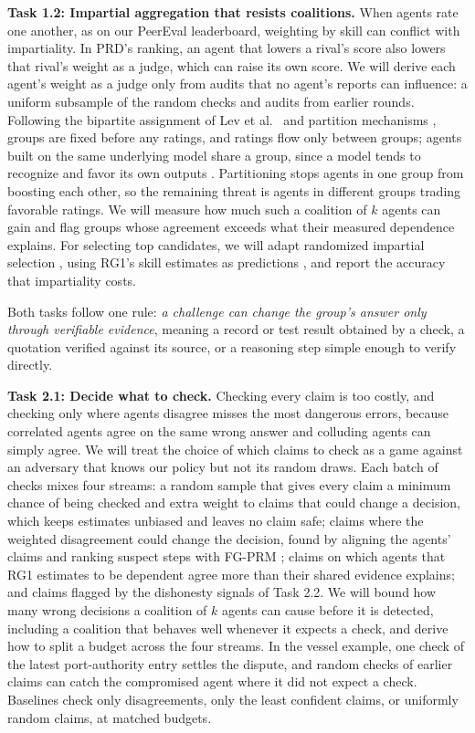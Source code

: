 \documentclass[11pt,letterpaper]{article}
\newcommand{\rg}[1]{\par\vspace{1pt}{\normalfont\bfseries\itshape #1}\par}
\newcommand{\task}[1]{\textbf{#1}\hspace{0.4em}}
\begin{document}
\task{Task 1.2: Impartial aggregation that resists coalitions.} When agents rate one another, as on our PeerEval leaderboard, weighting by skill can conflict with impartiality. In PRD's ranking, an agent that lowers a rival's score also lowers that rival's weight as a judge, which can raise its own score. We will derive each agent's weight as a judge only from audits that no agent's reports can influence: a uniform subsample of the random checks and audits from earlier rounds. Following the bipartite assignment of Lev et al.\ \cite{lev2023peernomination} and partition mechanisms \cite{alon2011sum}, groups are fixed before any ratings, and ratings flow only between groups; agents built on the same underlying model share a group, since a model tends to recognize and favor its own outputs \cite{panickssery2024recognize}. Partitioning stops agents in one group from boosting each other, so the remaining threat is agents in different groups trading favorable ratings. We will measure how much such a coalition of $k$ agents can gain and flag groups whose agreement exceeds what their measured dependence explains. For selecting top candidates, we will adapt randomized impartial selection \cite{kurokawa2015impartial}, using RG1's skill estimates as predictions \cite{cembrano2025predictions}, and report the accuracy that impartiality costs.

\rg{RG2. Decide what to check, and settle disputes with evidence}
Both tasks follow one rule: \emph{a challenge can change the group's answer only through verifiable evidence}, meaning a record or test result obtained by a check, a quotation verified against its source, or a reasoning step simple enough to verify directly.

\task{Task 2.1: Decide what to check.} Checking every claim is too costly, and checking only where agents disagree misses the most dangerous errors, because correlated agents agree on the same wrong answer and colluding agents can simply agree. We will treat the choice of which claims to check as a game against an adversary that knows our policy but not its random draws. Each batch of checks mixes four streams: a random sample that gives every claim a minimum chance of being checked and extra weight to claims that could change a decision, which keeps estimates unbiased and leaves no claim safe; claims where the weighted disagreement could change the decision, found by aligning the agents' claims and ranking suspect steps with FG-PRM \cite{li2025fgprm}; claims on which agents that RG1 estimates to be dependent agree more than their shared evidence explains; and claims flagged by the dishonesty signals of Task 2.2. We will bound how many wrong decisions a coalition of $k$ agents can cause before it is detected, including a coalition that behaves well whenever it expects a check, and derive how to split a budget across the four streams. In the vessel example, one check of the latest port-authority entry settles the dispute, and random checks of earlier claims can catch the compromised agent where it did not expect a check. Baselines check only disagreements, only the least confident claims, or uniformly random claims, at matched budgets.
\end{document}
